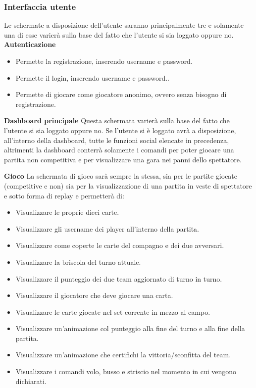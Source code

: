           \clearpage
           \subsubsection[Interfaccia Utente ]{\large {Interfaccia utente}\label{subsub:requirements:genericGui}}
           Le schermate a disposizione dell'utente saranno principalmente tre e solamente una di esse varierà sulla base del fatto che l'utente si sia loggato oppure no.
           \bigbreak
           \textbf{Autenticazione}
           \begin {itemize}
           \item Permette la registrazione, inserendo username e password.
           \item Permette il login, inserendo username e password..
           \item Permette di giocare come giocatore anonimo, ovvero senza bisogno di registrazione.
           \end {itemize}
           
           \bigbreak
           \textbf {Dashboard principale}
           \bigbreak
           Questa schermata varierà sulla base del fatto che l'utente si sia loggato oppure no. Se l'utente si è loggato avrà a disposizione, all'interno della dashboard, tutte le funzioni social elencate in precedenza, altrimenti la dashboard conterrà solamente i comandi per poter giocare una partita non competitiva e per visualizzare una gara nei panni dello spettatore.
           
           \bigbreak
           \textbf{Gioco}
           \bigbreak
           La schermata di gioco sarà sempre la stessa, sia per le partite giocate (competitive e non) sia per la visualizzazione di una partita in veste di spettatore e sotto forma di replay e permetterà di:
           \begin {itemize}
           \item Visualizzare le proprie dieci carte.
           \item Visualizzare gli username dei player all'interno della partita.
           \item Visualizzare come coperte le carte del compagno e dei due avversari.
           \item Visualizzare la briscola del turno attuale.
           \item Visualizzare il punteggio dei due team aggiornato di turno in turno.
           \item Visualizzare il giocatore che deve giocare una carta.
           \item Visualizzare le carte giocate nel set corrente in mezzo al campo.
           \item Visualizzare un'animazione col punteggio alla fine del turno e alla fine della partita.
           \item Visualizzare un'animazione che certifichi la vittoria/sconfitta del team.
           \item Visualizzare i comandi volo, busso e striscio nel momento in cui vengono dichiarati.
           \end {itemize}

